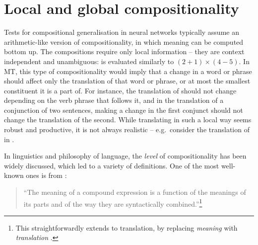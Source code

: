 \section{Local and global compositionality}
\label{sec:LoC}

Tests for compositional generalisation in neural networks typically assume an arithmetic-like version of compositionality, in which meaning can be computed bottom up.
The compositions require only local information -- they are context independent and unambiguous:   \citep[a fragment from SCAN by][]{lake2018generalization} is evaluated similarly to $(2 + 1) \times (4 - 5)$.
In MT, this type of compositionality would imply that a change in a word or phrase should affect only the translation of that word or phrase, or at most the smallest constituent it is a part of.
For instance, the translation of  should not change depending on the verb phrase that follows it, and in the translation of a conjunction of two sentences, making a change in the first conjunct should not change the translation of the second.
While translating in such a local way seems robust and productive, it is not always realistic -- e.g.\ consider the translation of 
 in .

In linguistics and philosophy of language, the \textit{level} of compositionality has been widely discussed, which led to a variety of definitions.
One of the most well-known ones is from \citet[][]{partee1984compositionality}:

\vspace{-.5mm}
\begin{quote}
``The meaning of a compound expression is a function of the meanings of its parts and of the way they are syntactically combined.''\footnote{This straightforwardly extends to translation, by replacing \emph{meaning} with \emph{translation} \citep{rosetta1994rosetta}.}
\end{quote}

